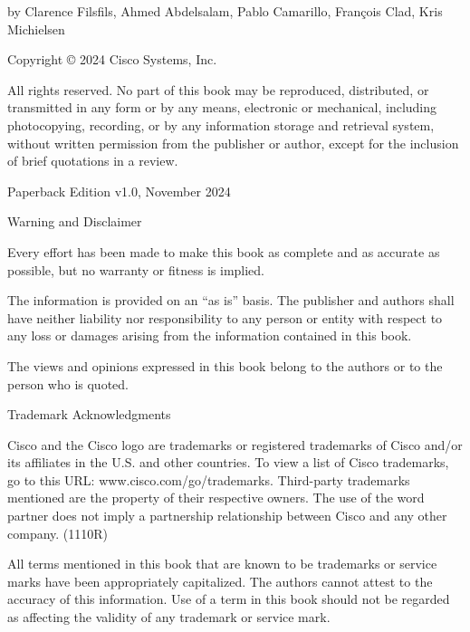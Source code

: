 by Clarence Filsfils, Ahmed Abdelsalam, Pablo Camarillo, François Clad, Kris Michielsen


Copyright © 2024 Cisco Systems, Inc.

All rights reserved. No part of this book may be reproduced, distributed, or transmitted in any form or by any means, electronic or mechanical, including photocopying, recording, or by any information storage and retrieval system, without written permission from the publisher or author, except for the inclusion of brief quotations in a review.

Paperback Edition v1.0, November 2024

\vspace*{0.5\baselineskip}
{\sffamily\small Warning and Disclaimer}\par
Every effort has been made to make this book as complete and as accurate as possible, but no warranty or fitness is implied.

The information is provided on an “as is” basis. The publisher and authors shall have neither liability nor responsibility to any person or entity with respect to any loss or damages arising from the information contained in this book.

The views and opinions expressed in this book belong to the authors or to the person who is quoted.

\vspace*{0.5\baselineskip}
{\sffamily\small Trademark Acknowledgments}\par
Cisco and the Cisco logo are trademarks or registered trademarks of Cisco and/or its affiliates in the U.S. and other countries. To view a list of Cisco trademarks, go to this URL: www.cisco.com/go/trademarks. Third-party trademarks mentioned are the property of their respective owners. The use of the word partner does not imply a partnership relationship between Cisco and any other company. (1110R)

All terms mentioned in this book that are known to be trademarks or service marks have been appropriately capitalized. The authors cannot attest to the accuracy of this information. Use of a term in this book should not be regarded as affecting the validity of any trademark or service mark.

